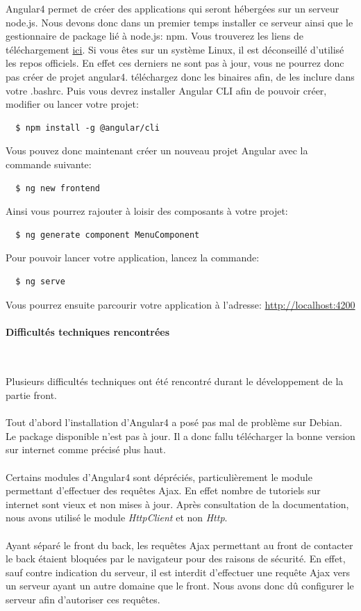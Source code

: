 \documentclass{article}
\begin{document}
  Angular4 permet de créer des applications qui seront hébergées sur un serveur node.js.
  Nous devons donc dans un premier temps installer ce serveur ainsi que le gestionnaire
  de package lié à node.js: npm. Vous trouverez les liens de téléchargement 
  \href{https://nodejs.org/en/download/}{ici}. Si vous êtes sur un système Linux,
  il est déconseillé d'utilisé les repos officiels. En effet ces derniers ne sont pas à jour,
  vous ne pourrez donc pas créer de projet angular4. téléchargez donc les binaires afin,
  de les inclure dans votre .bashrc. Puis vous devrez installer
  Angular CLI afin de pouvoir créer, modifier ou lancer votre projet:
  \begin{lstlisting}
  $ npm install -g @angular/cli
  \end{lstlisting}
  Vous pouvez donc maintenant créer un nouveau projet Angular avec la commande suivante:
  \begin{lstlisting}
  $ ng new frontend
  \end{lstlisting}
  Ainsi vous pourrez rajouter à loisir des composants à votre projet:
  \begin{lstlisting}
  $ ng generate component MenuComponent
  \end{lstlisting}
  Pour pouvoir lancer votre application, lancez la commande:
  \begin{lstlisting}
  $ ng serve
  \end{lstlisting}
  Vous pourrez ensuite parcourir votre application à l'adresse: \href{http://localhost:4200}{http://localhost:4200}
  
  \paragraph{Difficultés techniques rencontrées} \
  
  Plusieurs difficultés techniques ont été rencontré durant le développement de la partie front.\\ \\
  Tout d'abord l'installation d'Angular4 a posé pas mal de problème sur Debian. Le
  package disponible n'est pas à jour. Il a donc fallu télécharger la bonne version
  sur internet comme précisé plus haut. \\ \\
  Certains modules d'Angular4 sont dépréciés, particulièrement le module permettant
  d'effectuer des requêtes Ajax. En effet nombre de tutoriels sur internet sont vieux 
  et non mises à jour. Après consultation de la documentation, nous avons utilisé le
  module \emph{HttpClient} et non \emph{Http}. \\ \\
  Ayant séparé le front du back, les requêtes Ajax permettant au front de contacter le
  back étaient bloquées par le navigateur pour des raisons de sécurité. En effet, sauf contre indication
  du serveur, il est interdit d'effectuer une requête Ajax vers un serveur ayant 
  un autre domaine que le front. Nous avons donc dû configurer le serveur 
  afin d'autoriser ces requêtes.
\end{document}
